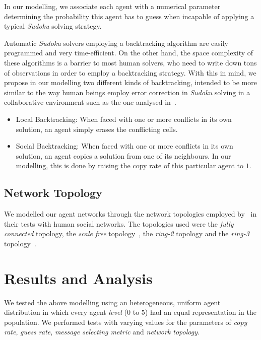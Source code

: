 \documentclass{article}
\begin{document}
In our modelling, we associate each agent with a numerical parameter determining the probability this agent has to guess when incapable of applying a typical {\em Sudoku} solving strategy.

Automatic {\em Sudoku} solvers employing a backtracking algorithm are easily programmed and very time-efficient. On the other hand, the space complexity of these algorithms is a barrier to most human solvers, who need to write down tons of observations in order to employ a backtracking strategy. With this in mind, we propose in our modelling two different kinds of backtracking, intended to be more similar to the way human beings employ error correction in {\em Sudoku} solving in a collaborative environment such as the one analysed in~\cite{farenzena:collabem}.

\begin{itemize}

\item
Local Backtracking: When faced with one or more conflicts in its own solution, an agent simply erases the conflicting cells.
\item
Social Backtracking: When faced with one or more conflicts in its own solution, an agent copies a solution from one of its neighbours. In our modelling, this is done by raising the copy rate of this particular agent to $1$.

\end{itemize}

\subsection{Network Topology}

We modelled our agent networks through the network topologies employed by~\cite{farenzena:collabem} in their tests with human social networks. The topologies used were the {\em fully connected} topology, the {\em scale free} topology~\cite{barabasi:linked}, the {\em ring-2} topology and the {\em ring-3} topology~\cite{newman:newtorks}.

\section{Results and Analysis}

We tested the above modelling using an heterogeneous, uniform agent distribution in which every agent {\em level} ($0$ to $5$) had an equal representation in the population. We performed tests with varying values for the parameters of {\em copy rate}, {\em guess rate}, {\em message selecting metric} and {\em network topology}.
\end{document}
